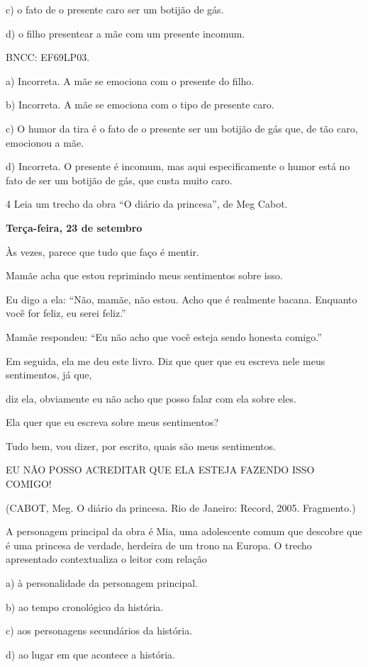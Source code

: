 {c) o fato de o presente caro ser um botijão de gás.

d) o filho presentear a mãe com um presente incomum.

BNCC: EF69LP03.

a) Incorreta. A mãe se emociona com o presente do filho.

b) Incorreta. A mãe se emociona com o tipo de presente caro.

c) O humor da tira é o fato de o presente ser um botijão de gás que, de
tão caro, emocionou a mãe.

d) Incorreta. O presente é incomum, mas aqui especificamente o humor
está no fato de ser um botijão de gás, que custa muito caro.

\num{4} Leia um trecho da obra ``O diário da princesa'', de Meg Cabot.

\textbf{Terça-feira, 23 de setembro}

Às vezes, parece que tudo que faço é mentir.

Mamãe acha que estou reprimindo meus sentimentos sobre isso.

Eu digo a ela: ``Não, mamãe, não estou. Acho que é realmente bacana.
Enquanto você for feliz, eu serei feliz.''

Mamãe respondeu: ``Eu não acho que você esteja sendo honesta comigo.''

Em seguida, ela me deu este livro. Diz que quer que eu escreva nele meus
sentimentos, já que,

diz ela, obviamente eu não acho que posso falar com ela sobre eles.

Ela quer que eu escreva sobre meus sentimentos?

Tudo bem, vou dizer, por escrito, quais são meus sentimentos.

EU NÃO POSSO ACREDITAR QUE ELA ESTEJA FAZENDO ISSO COMIGO!

(CABOT, Meg. O diário da princesa. Rio de Janeiro: Record, 2005.
Fragmento.)

A personagem principal da obra é Mia, uma adolescente comum que descobre
que é uma princesa de verdade, herdeira de um trono na Europa. O trecho
apresentado contextualiza o leitor com relação

a) à personalidade da personagem principal.

b) ao tempo cronológico da história.

c) aos personagens secundários da história.

d) ao lugar em que acontece a história.

}
